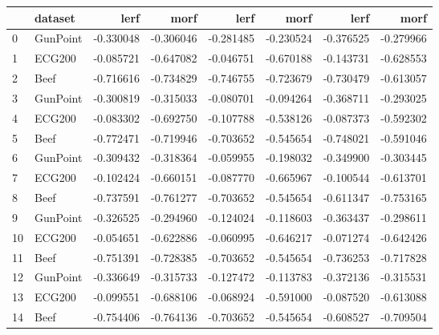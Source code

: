 \begin{tabular}{llrrrrrr}
\toprule
{} &   dataset &      lerf &      morf &      lerf &      morf &      lerf &      morf \\
\midrule
0  &  GunPoint & -0.330048 & -0.306046 & -0.281485 & -0.230524 & -0.376525 & -0.279966 \\
1  &    ECG200 & -0.085721 & -0.647082 & -0.046751 & -0.670188 & -0.143731 & -0.628553 \\
2  &      Beef & -0.716616 & -0.734829 & -0.746755 & -0.723679 & -0.730479 & -0.613057 \\
3  &  GunPoint & -0.300819 & -0.315033 & -0.080701 & -0.094264 & -0.368711 & -0.293025 \\
4  &    ECG200 & -0.083302 & -0.692750 & -0.107788 & -0.538126 & -0.087373 & -0.592302 \\
5  &      Beef & -0.772471 & -0.719946 & -0.703652 & -0.545654 & -0.748021 & -0.591046 \\
6  &  GunPoint & -0.309432 & -0.318364 & -0.059955 & -0.198032 & -0.349900 & -0.303445 \\
7  &    ECG200 & -0.102424 & -0.660151 & -0.087770 & -0.665967 & -0.100544 & -0.613701 \\
8  &      Beef & -0.737591 & -0.761277 & -0.703652 & -0.545654 & -0.611347 & -0.753165 \\
9  &  GunPoint & -0.326525 & -0.294960 & -0.124024 & -0.118603 & -0.363437 & -0.298611 \\
10 &    ECG200 & -0.054651 & -0.622886 & -0.060995 & -0.646217 & -0.071274 & -0.642426 \\
11 &      Beef & -0.751391 & -0.728385 & -0.703652 & -0.545654 & -0.736253 & -0.717828 \\
12 &  GunPoint & -0.336649 & -0.315733 & -0.127472 & -0.113783 & -0.372136 & -0.315531 \\
13 &    ECG200 & -0.099551 & -0.688106 & -0.068924 & -0.591000 & -0.087520 & -0.613088 \\
14 &      Beef & -0.754406 & -0.764136 & -0.703652 & -0.545654 & -0.608527 & -0.709504 \\
\bottomrule
\end{tabular}
